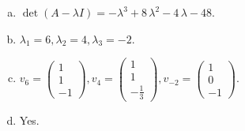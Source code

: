 \begin{questions}
\begin{solution}
\begin{enumerate}[(a)]
\item $\det(A-\lambda I)=-{\lambda}^{3} + 8 \, {\lambda}^{2} - 4 \, {\lambda} - 48$.
\item ${\lambda}_1=6, {\lambda}_2=4, {\lambda}_3=-2$.
\item $v_{6}=\left(\begin{array}{r}
1 \\
1 \\
-1
\end{array}\right), v_{4}=\left(\begin{array}{r}
1 \\
1 \\
-\frac{1}{3}
\end{array}\right), v_{-2}=\left(\begin{array}{r}
1 \\
0 \\
-1
\end{array}\right)$.
\item Yes.
\end{enumerate}
\end{solution}

\end{questions}

\newpage


\begin{center}
\end{center}

